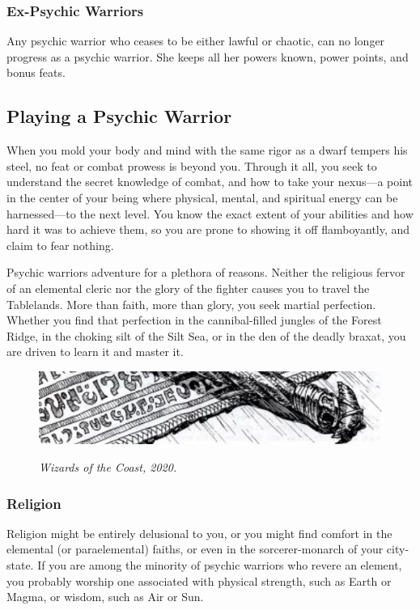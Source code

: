 \subsubsection{Ex-Psychic Warriors}
Any psychic warrior who ceases to be either lawful or chaotic, can no longer progress as a psychic warrior. She keeps all her powers known, power points, and bonus feats.

\vskip2cm
\subsection{Playing a Psychic Warrior}
When you mold your body and mind with the same rigor as a dwarf tempers his steel, no feat or combat prowess is beyond you. Through it all, you seek to understand the secret knowledge of combat, and how to take your nexus---a point in the center of your being where physical, mental, and spiritual energy can be harnessed---to the next level. You know the exact extent of your abilities and how hard it was to achieve them, so you are prone to showing it off flamboyantly, and claim to fear nothing.

Psychic warriors adventure for a plethora of reasons. Neither the religious fervor of an elemental cleric nor the glory of the fighter causes you to travel the Tablelands. More than faith, more than glory, you seek martial perfection. Whether you find that perfection in the cannibal-filled jungles of the Forest Ridge, in the choking silt of the Silt Sea, or in the den of the deadly braxat, you are driven to learn it and master it.

\begin{figure}[b!]
\centering
\includegraphics[width=\textwidth-2cm]{images/filler-2.png}
\par\textit{\small\textcopyright Wizards of the Coast, 2020.}
\end{figure}

\subsubsection{Religion}
Religion might be entirely delusional to you, or you might find comfort in the elemental (or paraelemental) faiths, or even in the sorcerer-monarch of your city-state. If you are among the minority of psychic warriors who revere an element, you probably worship one associated with physical strength, such as Earth or Magma, or wisdom, such as Air or Sun.

